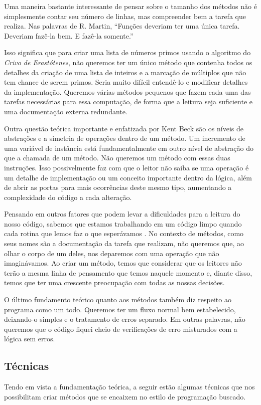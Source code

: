 Uma maneira bastante interessante de pensar sobre o tamanho dos métodos não é simplesmente contar seu número de linhas, mas compreender bem a tarefa que realiza. Nas palavras de R. Martin, “Funções deveriam ter uma única tarefa. Deveriam fazê-la bem. E fazê-la somente.”
	
Isso significa que para criar uma lista de números primos usando o algoritmo do \textit{Crivo de Erastótenes}, não queremos ter um único método que contenha todos os detalhes da criação de uma lista de inteiros e a marcação de múltiplos que não tem chance de serem primos. Seria muito difícil entendê-lo e modificar detalhes da implementação. Queremos várias métodos pequenos que fazem cada uma das tarefas necessárias para essa computação, de forma que a leitura seja suficiente e uma documentação externa redundante.
	
Outra questão teórica importante e enfatizada por Kent Beck são os níveis de abstrações e a simetria de operações dentro de um método. Um incremento de uma variável de instância está fundamentalmente em outro nível de abstração do que a chamada de um método. Não queremos um método com essas duas instruções. Isso possivelmente faz com que o leitor não saiba se uma operação é um detalhe de implementação ou um conceito importante dentro da lógica, além de abrir as portas para mais ocorrências deste mesmo tipo, aumentando a complexidade do código a cada alteração.
	
Pensando em outros fatores que podem levar a dificuldades para a leitura do nosso código, sabemos que estamos trabalhando em um código limpo quando cada rotina que lemos faz o que esperávamos \citep{Martin2008}. No contexto de métodos, como seus nomes são a documentação da tarefa que realizam, não queremos que, ao olhar o corpo de um deles, nos deparemos com uma operação que não imaginávamos. Ao criar um método, temos que considerar que os leitores não terão a mesma linha de pensamento que temos naquele momento e, diante disso, temos que ter uma crescente preocupação com todas as nossas decisões.
	
O último fundamento teórico quanto aos métodos também diz respeito ao programa como um todo. Queremos ter um fluxo normal bem estabelecido, deixando-o simples e o tratamento de erros separado. Em outras palavras, não queremos que o código fiquei cheio de verificações de erro misturados com a lógica sem erros.
	
\subsection{Técnicas}
Tendo em vista a fundamentação teórica, a seguir estão algumas técnicas que nos possibilitam criar métodos que se encaixem no estilo de programação buscado.

